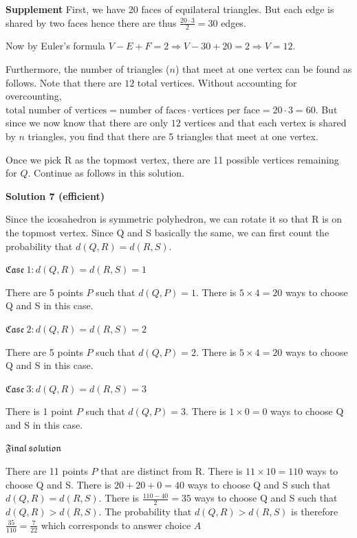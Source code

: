 \begin{enumerate}
 \textbf{Supplement} First, we have 20 faces of equilateral triangles. But each edge is shared by two faces hence there are thus $\frac{20 \cdot 3}{2}=30$ edges. 

 Now by Euler's formula $V-E+F=2 \Rightarrow V-30+20=2 \Rightarrow V=12.$ 

 Furthermore, the number of triangles ($n$) that meet at one vertex can be found as follows. Note that there are $12$ total vertices. Without accounting for overcounting, $\text{total number of vertices} = \text{number of faces} \cdot \text{vertices per face} = 20 \cdot 3 = 60.$ But since we now know that there are only $12$ vertices and that each vertex is shared by $n$ triangles, you find that there are 5 triangles that meet at one vertex.

 Once we pick R as the topmost vertex, there are 11 possible vertices remaining for $Q.$ Continue as follows in this solution.

 



\textbf{Solution 7 (efficient)}

Since the icosahedron is symmetric polyhedron, we can rotate it so that R is on the topmost vertex. Since Q and S basically the same, we can first count the probability that $d(Q,R) = d(R,S)$.

 $\mathfrak{Case} \ \mathfrak{1}: d(Q,R) = d(R,S) = 1$

 There are 5 points $P$ such that $d(Q,P) = 1$. There is $5 \times 4 = \boxed{20}$ ways to choose Q and S in this case.

 $\mathfrak{Case} \ \mathfrak{2}: d(Q,R) = d(R,S) = 2$

 There are 5 points $P$ such that $d(Q,P) = 2$. There is $5 \times 4 = \boxed{20}$ ways to choose Q and S in this case.

 $\mathfrak{Case} \ \mathfrak{3}: d(Q,R) = d(R,S) = 3$

 There is 1 point $P$ such that $d(Q,P) = 3$. There is $1 \times 0 = \boxed{0}$ ways to choose Q and S in this case.

 $\mathfrak{Final} \ \mathfrak{solution}$

 There are 11 points $P$ that are distinct from R. There is $11 \times 10 = \boxed{110}$ ways to choose Q and S. There is $20 + 20 + 0 = \boxed{40}$ ways to choose Q and S such that $d(Q,R) = d(R,S)$. There is $\frac{110-40}{2} = 35$ ways to choose Q and S such that $d(Q, R) > d(R, S)$. The probability that $d(Q, R) > d(R, S)$ is therefore $\frac{35}{110} = \frac{7}{22}$ which corresponds to answer choice $\boxed{A}$





\end{enumerate}
